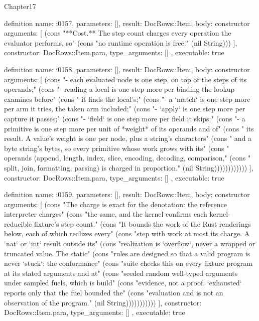 \begin{lexlean}{Chapter17}
\begin{semanticmodule}
definition{
  name: i0157,
  parameters: [],
  result: DocRows::Item,
  body: constructor{
    arguments: [
      (cons "**Cost.** The step count charges every operation the evaluator performs, so" (cons "no runtime operation is free:" (nil String)))
    ],
    constructor: DocRows::Item.para,
    type_arguments: []
  },
  executable: true
}

definition{
  name: i0158,
  parameters: [],
  result: DocRows::Item,
  body: constructor{
    arguments: [
      (cons "- each evaluated node is one step, on top of the steps of its operands;" (cons "- reading a local is one step more per binding the lookup examines before" (cons "  it finds the local's;" (cons "- a `match` is one step more per arm it tries, the taken arm included;" (cons "- `apply` is one step more per capture it passes;" (cons "- `field` is one step more per field it skips;" (cons "- a primitive is one step more per unit of *weight* of its operands and of" (cons "  its result. A value's weight is one per node, plus a string's characters" (cons "  and a byte string's bytes, so every primitive whose work grows with its" (cons "  operands (append, length, index, slice, encoding, decoding, comparison," (cons "  split, join, formatting, parsing) is charged in proportion." (nil String))))))))))))
    ],
    constructor: DocRows::Item.para,
    type_arguments: []
  },
  executable: true
}

definition{
  name: i0159,
  parameters: [],
  result: DocRows::Item,
  body: constructor{
    arguments: [
      (cons "The charge is exact for the denotation: the reference interpreter charges" (cons "the same, and the kernel confirms each kernel-reducible fixture's step count." (cons "It bounds the work of the Rust renderings below, each of which realizes every" (cons "step with work at most its charge. A `nat` or `int` result outside its" (cons "realization is `overflow`, never a wrapped or truncated value. The static" (cons "rules are designed so that a valid program is never `stuck`; the conformance" (cons "suite checks this on every fixture program at its stated arguments and at" (cons "seeded random well-typed arguments under sampled fuels, which is build" (cons "evidence, not a proof. `exhausted` reports only that the fuel bounded the" (cons "evaluation and is not an observation of the program." (nil String)))))))))))
    ],
    constructor: DocRows::Item.para,
    type_arguments: []
  },
  executable: true
}


\end{semanticmodule}
\end{lexlean}
